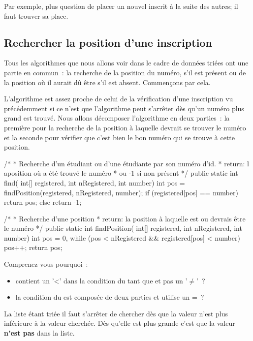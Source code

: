 		Par exemple, plus question de placer un nouvel inscrit à la suite des
		autres; il faut trouver sa place.
		
		\subsection{Rechercher la position d’une inscription}

			Tous les algorithmes que nous allons voir dans le cadre de données
			triées ont une partie en commun~: la recherche de la position du
			numéro, s’il est présent ou de la position où il aurait dû être s’il
			est absent.  Commençons par cela.
			
			L’algorithme est assez proche de celui de la vérification d’une
			inscription vu précédemment si ce n’est que l'algorithme peut
			s’arrêter dès qu'un numéro plus grand est trouvé. Nous allons
			décomposer l'algorithme en deux parties~: la première pour la
			recherche de la position à laquelle devrait se trouver le numéro et
			la seconde pour vérifier que c'est bien le bon numéro qui se trouve
			à cette position. 
			
			\begin{java}
/*
 * Recherche d'un étudiant ou d'une étudiante par son numéro d'id.
 * return: l aposition où a été trouvé le numéro 
 * ou -1 si non présent
 */
public static int find(
	int[] registered,
	int nRegistered,
	int number){
		int pos = findPosition(registered, nRegistered, number);
		if (registered[pos] == number){
			return pos;
		} else {
			return -1;
		}
}

/*
 * Recherche d'une position
 * return: la position à laquelle est ou devrais être le numéro
 */
public static int findPosition(
		int[] registered,
		int nRegistered,
		int number){
	int pos = 0,
	while (pos < nRegistered && registered[pos] < number){
		pos++;
	}
	return pos;
}
			\end{java}
			
			Comprenez-vous pourquoi~:
			\begin{itemize}
			\item
				 contient un '<' dans la 
				condition du tant que et pas un '$\neq$'~?
			\item
				la condition du  est composée de deux parties
				et utilise un =~?
			\end{itemize}

			La liste étant triée il faut s'arrêter de chercher dès que la valeur
			n'est plus inférieure à la valeur cherchée. Dès qu'elle est plus
			grande c'est que la valeur \textbf{n'est pas} dans la liste. 

